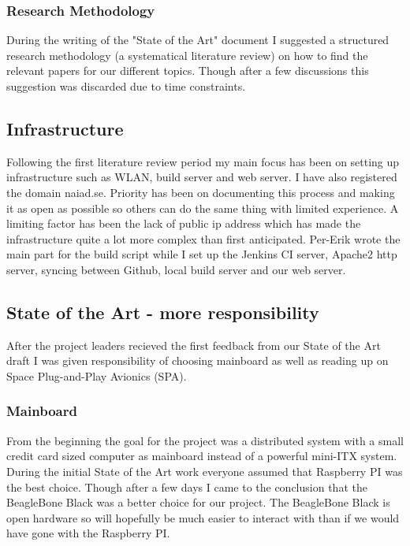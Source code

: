 \subsubsection{Research Methodology}
During the writing of the "State of the Art" document I suggested a structured
research methodology (a systematical literature review) on how to find the relevant
papers for our different topics. Though after a few discussions this
suggestion was discarded due to time constraints.

\subsection{Infrastructure}
Following the first literature review period my main focus has been on setting
up infrastructure such as WLAN, build server and web server.
I have also registered the domain naiad.se. Priority has been
on documenting this process and making it as open as possible so others can do
the same thing with limited experience.
A limiting factor has been the lack of public ip address which has
made the infrastructure quite a lot more complex than first anticipated.
Per-Erik wrote the main part for the build script while I set up the Jenkins
CI server, Apache2 http server, syncing between Github, local build server and our web
server.

\subsection{State of the Art - more responsibility}
After the project leaders recieved the first feedback from our State of the Art
draft I was given responsibility of choosing mainboard as well as reading up on
Space Plug-and-Play Avionics (SPA).

\subsubsection{Mainboard}
From the beginning the goal for the project was a distributed system with a
small credit card sized computer as mainboard instead of a powerful mini-ITX
system. During the initial State of the Art work everyone assumed that
Raspberry PI was the best choice. Though after a few days I came to the
conclusion that the BeagleBone Black was a better choice for our project.
The BeagleBone Black is open hardware so will hopefully be much easier to
interact with than if we would have gone with the Raspberry PI.

